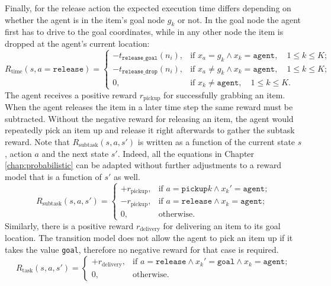 Finally, for the release action the expected execution time differs depending on whether the agent is in the item's goal node $g_k$ or not. In the goal node the agent first has to drive to the goal coordinates, while in any other node the item is dropped at the agent's current location: 
\begin{equation}
     R_\text{time}(s, a=\texttt{release}) = \begin{cases}
    -t_\texttt{release\_goal}(n_i), & \text{if }x_a=g_k \land x_k=\texttt{agent}, \quad 1 \leq k \leq K; \\
    -t_\texttt{release\_drop}(n_i), & \text{if }x_a\neq g_k \land x_k=\texttt{agent}, \quad 1 \leq k \leq K;\\
    0, & \text{if }x_k \neq \texttt{agent}, \quad 1 \leq k \leq K.
    \end{cases}
\end{equation}
The agent receives a positive reward $r_\text{pickup}$ for successfully grabbing an item. When the agent releases the item in a later time step the same reward must be subtracted. Without the negative reward for releasing an item, the agent would repeatedly pick an item up and release it right afterwards to gather the subtask reward. Note that $R_\text{subtask}(s,a,s')$ is written as a function of the current state $s$, action $a$ and the next state $s'$. Indeed, all the equations in Chapter \ref{chap:probabilistic} can be adapted without further adjustments to a reward model that is a function of $s'$ as well. 
\begin{equation}
    R_\text{subtask}(s,a,s') = \begin{cases}
    +r_\text{pickup}, & \text{if }a=\texttt{pickup}k \land x_k'=\texttt{agent};\\
    -r_\text{pickup}, & \text{if }a=\texttt{release}\land x_k=\texttt{agent};\\
    0, & \text{otherwise}.\end{cases}
\end{equation}
Similarly, there is a positive reward $r_\text{delivery}$ for delivering an item to its goal location. The transition model does not allow the agent to pick an item up if it takes the value \texttt{goal}, therefore no negative reward for that case is required. 
\begin{equation}
    R_\text{task}(s,a,s') = \begin{cases} + r_\text{delivery}, & \text{if }a=\texttt{release}\land x_k'=\texttt{goal}\land x_k=\texttt{agent};\\
    0, & \text{otherwise}.
    \end{cases}
\end{equation}
